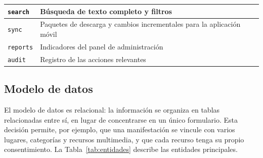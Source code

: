 {\begin{tabular}{|p{}|p{}|}
    \hline
    \raggedright\hspace{0pt}\texttt{search} & \raggedright\hspace{0pt}Búsqueda de texto completo y filtros \tabularnewline
    \hline
    \raggedright\hspace{0pt}\texttt{sync} & \raggedright\hspace{0pt}Paquetes de descarga y cambios incrementales para la aplicación móvil \tabularnewline
    \hline
    \raggedright\hspace{0pt}\texttt{reports} & \raggedright\hspace{0pt}Indicadores del panel de administración \tabularnewline
    \hline
    \raggedright\hspace{0pt}\texttt{audit} & \raggedright\hspace{0pt}Registro de las acciones relevantes \tabularnewline
    \hline
  \end{tabular}\par}

\subsection{Modelo de datos}
El modelo de datos es relacional: la información se organiza en tablas relacionadas entre sí, en lugar de concentrarse en un único formulario. Esta decisión permite, por ejemplo, que una manifestación se vincule con varios lugares, categorías y recursos multimedia, y que cada recurso tenga su propio consentimiento. La Tabla~\ref{tab:entidades} describe las entidades principales.

